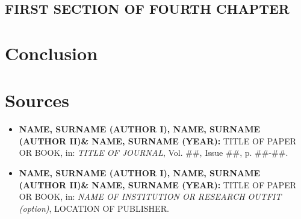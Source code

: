 \documentclass[11pt,a4paper,english]{scrreprt}
\begin{document}
  \section{FIRST SECTION OF FOURTH CHAPTER}


  
  
\chapter{Conclusion}







\chapter{Sources}

  \begin{itemize}
	
	\sffamily
	

	\item [\Rectsteel] \textbf{NAME, SURNAME (AUTHOR I), NAME, SURNAME
(AUTHOR II)\& NAME, SURNAME (YEAR):} TITLE OF PAPER OR BOOK,
in: \textsl{TITLE OF JOURNAL}, Vol. ##, Issue ##, p. ##-##.


	\item [\Rectsteel] \textbf{NAME, SURNAME (AUTHOR I), NAME, SURNAME
(AUTHOR II)\& NAME, SURNAME (YEAR):} TITLE OF PAPER OR BOOK,
in: \textsl{NAME OF INSTITUTION OR RESEARCH OUTFIT (option)}, LOCATION OF
PUBLISHER.


  \end{itemize}
\end{document}
